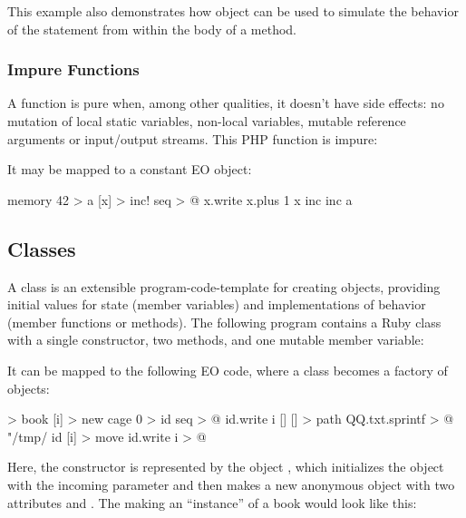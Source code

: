 \documentclass[sigplan,11pt,nonacm,natbib=false]{acmart}
\begin{document}
This example also demonstrates how  object can be used to simulate the behavior of the  statement from within the body of a method.

\subsubsection{Impure Functions}

A function is pure when, among other qualities, it doesn't have side effects:
no mutation of local static variables, non-local variables, mutable reference arguments
or input/output streams. This PHP function is impure:


It may be mapped to a constant EO object:

\begin{ffcode}
memory 42 > a
[x] > inc!
  seq > @
  x.write
    x.plus 1
  x
inc
  inc a
\end{ffcode}

\subsection{Classes}
\label{sec:classes}

A class is an extensible program-code-template for creating objects, providing initial values for state (member variables) and implementations of behavior (member functions or methods). The following program contains a Ruby class with a single constructor, two methods, and one mutable member variable:


It can be mapped to the following EO code, where a class becomes a factory of objects:

\begin{ffcode}
[] > book
  [i] > new
    cage 0 > id
    seq > @
      id.write i
      []
        [] > path
          QQ.txt.sprintf > @
            "/tmp/%
            id
        [i] > move
          id.write i > @
\end{ffcode}

Here, the constructor is represented by the object , which initializes the object  with the incoming parameter  and then makes a new anonymous object with two attributes  and . The making an ``instance'' of a book would look like this:
\end{document}
